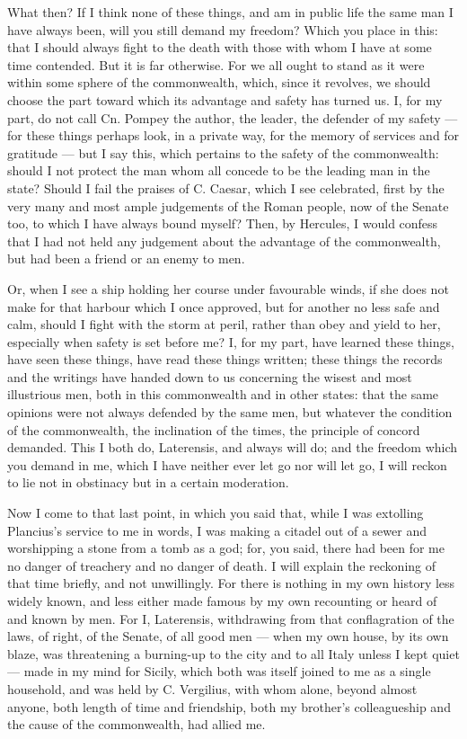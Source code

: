  What then? If I think none of these things, and am in public life the same man I have always been, will you still demand my freedom? Which you place in this: that I should always fight to the death with those with whom I have at some time contended. But it is far otherwise. For we all ought to stand as it were within some sphere of the commonwealth, which, since it revolves, we should choose the part toward which its advantage and safety has turned us. I, for my part, do not call Cn. Pompey the author, the leader, the defender of my safety --- for these things perhaps look, in a private way, for the memory of services and for gratitude --- but I say this, which pertains to the safety of the commonwealth: should I not protect the man whom all concede to be the leading man in the state? Should I fail the praises of C. Caesar, which I see celebrated, first by the very many and most ample judgements of the Roman people, now of the Senate too, to which I have always bound myself? Then, by Hercules, I would confess that I had not held any judgement about the advantage of the commonwealth, but had been a friend or an enemy to men.

 Or, when I see a ship holding her course under favourable winds, if she does not make for that harbour which I once approved, but for another no less safe and calm, should I fight with the storm at peril, rather than obey and yield to her, especially when safety is set before me? I, for my part, have learned these things, have seen these things, have read these things written; these things the records and the writings have handed down to us concerning the wisest and most illustrious men, both in this commonwealth and in other states: that the same opinions were not always defended by the same men, but whatever the condition of the commonwealth, the inclination of the times, the principle of concord demanded. This I both do, Laterensis, and always will do; and the freedom which you demand in me, which I have neither ever let go nor will let go, I will reckon to lie not in obstinacy but in a certain moderation.

 Now I come to that last point, in which you said that, while I was extolling Plancius's service to me in words, I was making a citadel out of a sewer and worshipping a stone from a tomb as a god; for, you said, there had been for me no danger of treachery and no danger of death. I will explain the reckoning of that time briefly, and not unwillingly. For there is nothing in my own history less widely known, and less either made famous by my own recounting or heard of and known by men. For I, Laterensis, withdrawing from that conflagration of the laws, of right, of the Senate, of all good men --- when my own house, by its own blaze, was threatening a burning-up to the city and to all Italy unless I kept quiet --- made in my mind for Sicily, which both was itself joined to me as a single household, and was held by C. Vergilius, with whom alone, beyond almost anyone, both length of time and friendship, both my brother's colleagueship and the cause of the commonwealth, had allied me.

